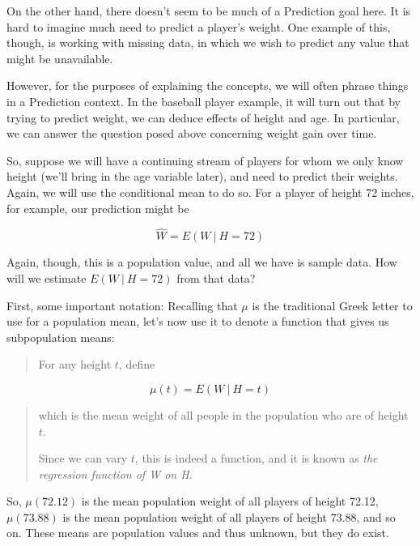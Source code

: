 On the other hand, there doesn't seem to be much of a Prediction goal
here.  It is hard to imagine much need to predict a player's weight.
One example of this, though, is working with missing data, in which we
wish to predict any value that might be unavailable.

However, for the purposes of explaining the concepts, we will often
phrase things in a Prediction context.  In the baseball player example,
it will turn out that by trying to predict weight, we can deduce effects
of height and age.  In particular, we can answer the question posed
above concerning weight gain over time.

So, suppose we will have a continuing stream of players for whom we only
know height (we'll bring in the age variable later), and need to predict
their weights.  Again, we will use the conditional mean to do so.  For a
player of height 72 inches, for example, our prediction might be

\begin{equation}
\widehat{W} = E(W ~|~ H = 72)
\end{equation}

Again, though, this is a population value, and all we have is sample
data.  How will we estimate $E(W ~|~ H = 72)$ from that data?

First, some important notation:  Recalling that $\mu$ is the traditional
Greek letter to use for a population mean, let's now use it to denote a
function that gives us subpopulation means:

\begin{quote}

For any height $t$, define
\end{quote}

\begin{equation}
\label{regdef}
\mu(t) = E(W ~|~ H = t)
\end{equation}

\begin{quote}
which is the mean weight of all people in the population who are of
height $t$.

Since we can vary $t$, this is indeed a function, and it is known as
{\it the regression function of W on H}.

\end{quote}

So, $\mu(72.12)$ is the mean population weight of all players of height 72.12, 
$\mu(73.88)$ is the mean population weight of all players of height
73.88, and so on.  These means are population values and thus unknown,
but they do exist. 

